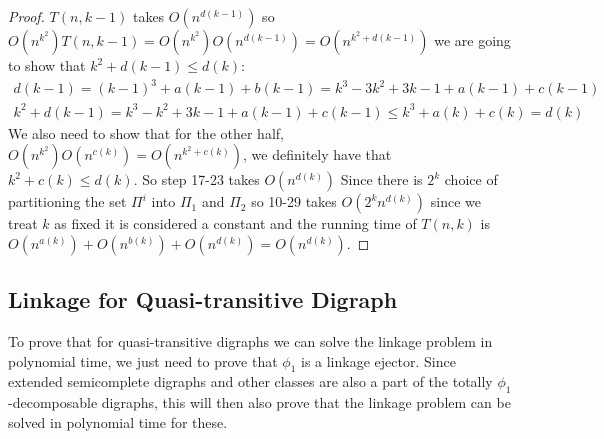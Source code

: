 \begin{proof}
    $T(n,k-1)$ takes $O(n^{d(k-1)})$ so $O(n^{k^2})T(n,k-1)=O(n^{k^2})O(n^{d(k-1)})=O(n^{k^2+d(k-1)})$ we are going to show that $k^2+d(k-1)\leq d(k)$:
    \begin{align}
        d(k-1)=(k-1)^3+a(k-1)+b(k-1)=k^3-3k^2+3k-1+a(k-1)+c(k-1)\\
        k^2+d(k-1)=k^3-k^2+3k-1+a(k-1)+c(k-1)\leq k^3+a(k)+c(k)=d(k)
    \end{align} 
    We also need to show that for the other half, $O(n^{k^2})O(n^{c(k)})=O(n^{k^2+c(k)})$, we definitely have that $k^2+c(k)\leq d(k)$.
    So step 17-23 takes $O(n^{d(k)})$
    Since there is $2^k$ choice of partitioning the set $\Pi^i$ into $\Pi_1$ and $\Pi_2$ so 10-29 takes $O(2^kn^{d(k)})$ since we treat $k$ as fixed it is considered a constant and the running time of $T(n,k)$ is $O(n^{a(k)})+O(n^{b(k)})+O(n^{d(k)})=O(n^{d(k)})$.
\end{proof}

\subsection{Linkage for Quasi-transitive Digraph}
To prove that for quasi-transitive digraphs we can solve the linkage problem in polynomial time, we just need to prove that $\phi_1$ is a linkage ejector. 
Since extended semicomplete digraphs and other classes are also a part of the totally $\phi_1$-decomposable digraphs, this will then also prove that the linkage problem can be solved in polynomial time for these.

